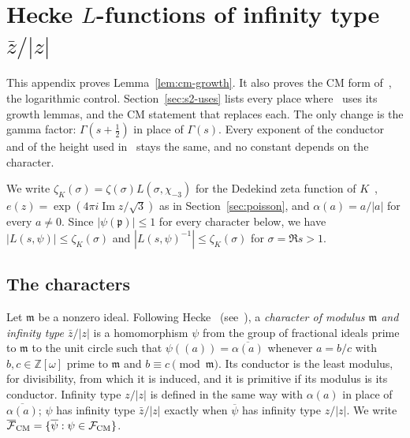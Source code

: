 \documentclass[11pt]{article}
\numberwithin{equation}{section}
\newcommand{\OO}{\mathbb Z[\omega]}
\begin{document}
\section{Hecke \texorpdfstring{$L$}{L}-functions of infinity type \texorpdfstring{$\bar z/|z|$}{zbar/|z|}}\label{app:s2-hecke}

This appendix proves Lemma~\ref{lem:cm-growth}. It also proves the CM form
of~\cite[Lemma~4.9]{OAI78}, the logarithmic control. Section~\ref{sec:s2-uses} lists every
place where~\cite{OAI78} uses its growth lemmas, and the CM statement that replaces each. The only change is the gamma factor:
$\Gamma(s+\frac12)$ in place of $\Gamma(s)$. Every exponent of the conductor and of the height used
in~\cite{OAI78} stays the same, and no constant depends on the character.

We write $\zeta_K(\sigma)=\zeta(\sigma)L(\sigma,\chi_{-3})$ for the Dedekind zeta function of
$K$~\cite[Theorem~3]{QF}, $e(z)=\exp(4\pi i\operatorname{Im}z/\sqrt3)$ as in Section~\ref{sec:poisson}, and
$\alpha(a)=a/|a|$ for every $a\ne0$. Since $|\psi(\mathfrak p)|\le1$ for every character below, we have
$|L(s,\psi)|\le\zeta_K(\sigma)$ and $|L(s,\psi)^{-1}|\le\zeta_K(\sigma)$ for $\sigma=\Re s>1$.

\subsection{The characters}\label{sec:s2-chars}
Let $\mathfrak m$ be a nonzero ideal. Following Hecke~\cite{Hec20} (see~\cite[Ch.~VII, \S6]{Neukirch}), a \emph{character of modulus $\mathfrak m$ and infinity type $\bar z/|z|$}
is a homomorphism $\psi$ from the group of fractional ideals prime to $\mathfrak m$ to the unit circle such
that $\psi((a))=\overline{\alpha(a)}$ whenever $a=b/c$ with $b,c\in\OO$ prime to $\mathfrak m$ and
$b\equiv c\pmod{\mathfrak m}$. Its conductor is the least modulus, for divisibility, from which it is induced,
and it is primitive if its modulus is its conductor. Infinity type $z/|z|$ is defined in the same way with
$\alpha(a)$ in place of $\overline{\alpha(a)}$; $\psi$ has infinity type $\bar z/|z|$ exactly when
$\overline\psi$ has infinity type $z/|z|$. We write $\overline{\mathcal F}_{\rm CM}=\{\overline\psi:
\psi\in\mathcal F_{\rm CM}\}$.
\end{document}
